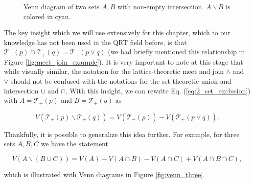 \begin{figure}[h!] %
    \centering
    \caption{Venn diagram of two sets $A, B$ with non-empty intersection. $A \backslash B$ is colored in cyan.}
    \label{fig:venn_two}
\end{figure}

The key insight which we will use extensively for this chapter, which to our knowledge has not been used in the QRT field before, is that $\mathcal{T}_+(p) \cap \mathcal{T}_+(q) = \mathcal{T}_+(p \vee q)$ (we had briefly mentioned this relationship in Figure \ref{fig:meet_join_example}). It is very important to note at this stage that while visually similar, the notation for the lattice-theoretic meet and join $\wedge$ and $\vee$ should not be confused with the notations for the set-theoretic union and intersection $\cup$ and $\cap$. With this insight, we can rewrite Eq. (\ref{eq:2_set_exclusion}) with $A = \mathcal{T}_+(p)$ and $B = \mathcal{T}_+(q)$ as

\begin{equation}
    V(\mathcal{T}_+(p) \backslash \mathcal{T}_+(q)) = V(\mathcal{T}_+(p)) - V(\mathcal{T}_+(p \vee q)).
\end{equation}

Thankfully, it is possible to generalize this idea further. For example, for three sets $A, B, C$ we have the statement

\begin{equation}
    V(A \backslash (B \cup C)) = V(A) - V(A \cap B) - V(A \cap C) + V(A \cap B \cap C),
\end{equation}

\noindent which is illustrated with Venn diagrams in Figure \ref{fig:venn_three}.

